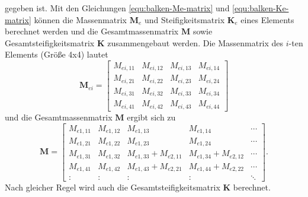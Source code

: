 \documentclass[a4paper,10pt,twoside]{article}
\numberwithin{equation}{section} %
\numberwithin{figure}{section}   %
\numberwithin{table}{section}    %
\begin{document}
	gegeben ist. Mit den Gleichungen \eqref{equ:balken-Me-matrix} und \eqref{equ:balken-Ke-matrix} können die Massenmatrix $ \mathbf{M}_{e} $ und Steifigkeitsmatrix $ \mathbf{K}_{e} $ eines Elements berechnet werden und die Gesamtmassenmatrix $ \mathbf{M} $ sowie Gesamtsteifigkeitsmatrix $ \mathbf{K} $ zusammengebaut werden.  Die Massenmatrix des $i$-ten Elements (Größe 4x4) lautet
	\begin{equation}\label{equ:kubik-Mei-matrix}
	\mathbf{M}_{ei} = \left[ 
	\begin{array}{cccc}
	M_{ei,11} & M_{ei,12} & M_{ei,13} & M_{ei,14}\\
	M_{ei,21} & M_{ei,22} & M_{ei,23} & M_{ei,24}\\
	M_{ei,31} & M_{ei,32} & M_{ei,33} & M_{ei,34}\\
	M_{ei,41} & M_{ei,42} & M_{ei,43} & M_{ei,44}
	\end{array}
	\right] 
	\end{equation}
	und die Gesamtmassenmatrix $ \mathbf{M} $ ergibt sich zu
	\begin{equation}\label{equ:kubik-M-Matrix}
	\mathbf{M} = 
	\left[ 
	\begin{array}{ccccc}
	M_{e1,11} & M_{e1,12} & M_{e1,13}           & M_{e1,14}           & \cdots \\
	M_{e1,21} & M_{e1,22} & M_{e1,23}           & M_{e1,24}           & \cdots \\
	M_{e1,31} & M_{e1,32} & M_{e1,33}+M_{e2,11} & M_{e1,34}+M_{e2,12} & \cdots \\
	M_{e1,41} & M_{e1,42} & M_{e1,43}+M_{e2,21} & M_{e1,44}+M_{e2,22} & \cdots \\
	\colon    & \colon    & \colon              & \colon              & \ddots 
	\end{array}
	\right].
	\end{equation}
	Nach gleicher Regel wird auch die Gesamtsteifigkeitsmatrix $ \mathbf{K} $ berechnet.
	
\end{document}
